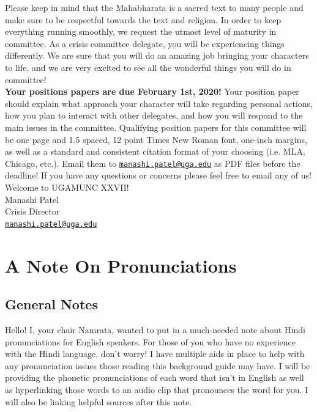 \documentclass[10pt, letterpaper]{article}
\begin{document}
Please keep in mind that the Mahabharata is a sacred text to many people
and make sure to be respectful towards the text and religion. In order
to keep everything running smoothly, we request the utmost level of
maturity in committee. As a crisis committee delegate, you will be
experiencing things differently. We are sure that you will do an amazing
job bringing your characters to life, and we are very excited to see all
the wonderful things you will do in committee! \\

\textbf{Your positions papers are due February 1st, 2020!}
Your position paper should explain what approach your character will
take regarding personal actions, how you plan to interact with other
delegates, and how you will respond to the main issues in the committee.
Qualifying position papers for this committee will be one page and 1.5
spaced, 12 point Times New Roman font, one-inch margins, as well as a
standard and consistent citation format of your choosing (i.e. MLA,
Chicago, etc.). Email them to
\texttt{\href{mailto:manashi.patel@uga.edu}{\underline{manashi.patel@uga.edu}}}
as PDF files before the deadline! If you have any questions or concerns
please feel free to email any of us! \\

Welcome to UGAMUNC XXVII! \\

Manashi Patel \\
Crisis Director \\
\texttt{\href{mailto:manashi.patel@uga.edu}{\underline{manashi.patel@uga.edu}}}

\newpage
\tableofcontents
\newpage

\section{A Note On Pronunciations}

\subsection{General Notes}

Hello! I, your chair Namrata, wanted to put in a much-needed note about
Hindi pronunciations for English speakers. For those of you who have no
experience with the Hindi language, don't worry! I have multiple aids in
place to help with any pronunciation issues those reading this
background guide may have. I will be providing the phonetic
pronunciations of each word that isn't in English as well as
hyperlinking those words to an audio clip that pronounces the word for
you. I will also be linking helpful sources after this note. \\
\end{document}
